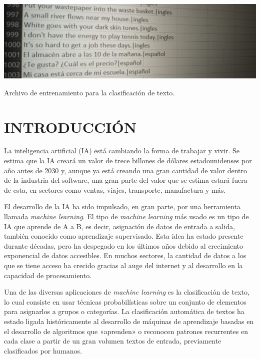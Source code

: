 \documentclass[sigconf]{acmart}
\begin{document}
\begin{teaserfigure}
 \includegraphics[width=\textwidth]{mainTeaser}
 \caption{Archivo de entrenamiento para la clasificación de texto.}
 \label{fig:teaser}
\end{teaserfigure}

\maketitle

\section{INTRODUCCIÓN}
La inteligencia artificial (IA) está cambiando la forma de trabajar y vivir. Se estima que la IA creará un valor de trece billones de dólares estadounidenses por año antes de 2030 y, aunque ya está creando una gran cantidad de valor dentro de la industria del software, una gran parte del valor que se estima estará fuera de esta, en sectores como ventas, viajes, transporte, manufactura y más.

El desarrollo de la IA ha sido impulsado, en gran parte, por una herramienta llamada {\itshape machine learning}. El tipo de {\itshape machine learning} más usado es un tipo de IA que aprende de A a B, es decir, asignación de datos de entrada a salida, también conocido como aprendizaje supervisado. Esta idea ha estado presente durante décadas, pero ha despegado en los últimos años debido al crecimiento exponencial de datos accesibles. En muchos sectores, la cantidad de datos a los que se tiene acceso ha crecido gracias al auge del internet y al desarrollo en la capacidad de procesamiento.

Una de las diversas aplicaciones de {\itshape machine learning} es la clasificación de texto, lo cual consiste en usar técnicas probabilísticas sobre un conjunto de elementos para asignarlos a grupos o categorías.  La clasificación automática de textos ha estado ligada históricamente al desarrollo  de máquinas de aprendizaje basadas en el desarrollo de algoritmos que «aprenden» o reconocen patrones recurrentes en cada clase a partir de un gran volumen textos de entrada, previamente clasificados por humanos.
\end{document}
